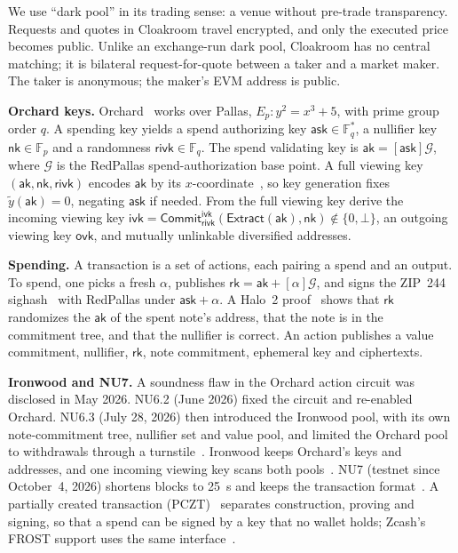 \documentclass[10pt,letterpaper]{article}
\makeatletter
\renewcommand\section{\@startsection{section}{1}{\z@}{-1.3em}{0.45em}{\normalfont\large\bfseries}}
\theoremstyle{plain}
\theoremstyle{definition}
\newcommand{\ak}{\mathsf{ak}}
\newcommand{\ask}{\mathsf{ask}}
\newcommand{\nk}{\mathsf{nk}}
\newcommand{\rivk}{\mathsf{rivk}}
\newcommand{\ivk}{\mathsf{ivk}}
\newcommand{\ovk}{\mathsf{ovk}}
\newcommand{\rk}{\mathsf{rk}}
\newcommand{\Gor}{\mathcal{G}}
\newcommand{\ytilde}{\tilde{y}}
\makeatother
\begin{document}
We use ``dark pool'' in its trading sense: a venue without pre-trade transparency. Requests and
quotes in Cloakroom travel encrypted, and only the executed price becomes public. Unlike an
exchange-run dark pool, Cloakroom has no central matching; it is bilateral request-for-quote
between a taker and a market maker. The taker is anonymous; the maker's EVM address is public.

\section{Background}

\textbf{Orchard keys.} Orchard~\cite[\S4.2.3]{spec} works over Pallas,
$E_p: y^2 = x^3 + 5$, with prime group order $q$. A spending key yields a spend authorizing key
$\ask \in \mathbb{F}_q^*$, a nullifier key $\nk \in \mathbb{F}_p$ and a randomness
$\rivk \in \mathbb{F}_q$. The spend validating key is $\ak = [\ask]\Gor$, where $\Gor$ is the
RedPallas spend-authorization base point. A full viewing key $(\ak, \nk, \rivk)$ encodes $\ak$
by its $x$-coordinate~\cite[\S5.6.4.4]{spec}, so key generation fixes $\ytilde(\ak)=0$, negating
$\ask$ if needed. From the full viewing key derive the incoming viewing key
$\ivk = \mathsf{Commit}^{\ivk}_{\rivk}(\mathsf{Extract}(\ak),\nk) \notin \{0,\bot\}$, an outgoing
viewing key $\ovk$, and mutually unlinkable diversified addresses.

\textbf{Spending.} A transaction is a set of actions, each pairing a spend and an output. To
spend, one picks a fresh $\alpha$, publishes $\rk = \ak + [\alpha]\Gor$, and signs the ZIP~244
sighash~\cite{zip244} with RedPallas under $\ask + \alpha$. A Halo~2 proof~\cite{halo2} shows
that $\rk$ randomizes the $\ak$ of the spent note's address, that the note is in the commitment
tree, and that the nullifier is correct. An action publishes a value commitment, nullifier,
$\rk$, note commitment, ephemeral key and ciphertexts.

\textbf{Ironwood and NU7.} A soundness flaw in the Orchard action circuit was disclosed in May
2026. NU6.2 (June 2026) fixed the circuit and re-enabled Orchard. NU6.3 (July 28, 2026) then
introduced the Ironwood pool, with its own note-commitment tree, nullifier set and value pool, and
limited the Orchard pool to withdrawals through a turnstile~\cite{zip258}. Ironwood keeps Orchard's keys and addresses, and one incoming
viewing key scans both pools~\cite{zip326}. NU7 (testnet since October~4, 2026) shortens blocks to
25~s and keeps the transaction format~\cite{zip259}. A partially created transaction
(PCZT)~\cite{zip374} separates construction, proving and signing, so that a spend can be signed
by a key that no wallet holds; Zcash's FROST support uses the same interface~\cite{frost,zip312}.
\end{document}
